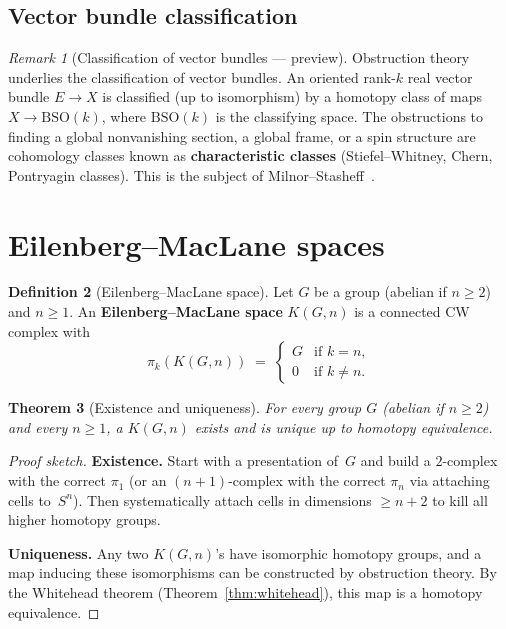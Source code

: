 \documentclass[12pt,a4paper,openany]{book}
\theoremstyle{definition}
\newtheorem{definition}{Definition}[chapter]
\theoremstyle{plain}
\newtheorem{theorem}[definition]{Theorem}
\theoremstyle{remark}
\newtheorem{remark}[definition]{Remark}
\begin{document}
\subsection{Vector bundle classification}

\begin{remark}[Classification of vector bundles --- preview]
Obstruction theory underlies the classification of vector
bundles.  An oriented rank-$k$ real vector bundle
$E\to X$ is classified (up to isomorphism) by a homotopy class
of maps $X\to\mathrm{BSO}(k)$,
where $\mathrm{BSO}(k)$ is the classifying space.  The obstructions
to finding a global nonvanishing section, a global frame, or a
spin structure are cohomology classes known as
\textbf{characteristic classes}
(Stiefel--Whitney,
Chern,
Pontryagin classes).  This is the subject of
Milnor--Stasheff~\cite{milnor-stasheff}.
\end{remark}

\section{Eilenberg--MacLane spaces}\label{sec:eilenberg-maclane}

\begin{definition}[Eilenberg--MacLane space]
Let $G$ be a group (abelian if $n\ge2$) and $n\ge1$.  An
\textbf{Eilenberg--MacLane space} $K(G,n)$ is a connected CW
complex with
\[
  \pi_k(K(G,n))
  \;=\;
  \begin{cases}
    G & \text{if } k=n,\\
    0 & \text{if } k\ne n.
  \end{cases}
\]
\end{definition}

\begin{theorem}[Existence and uniqueness]
\label{thm:em-existence}
For every group $G$ (abelian if $n\ge2$) and every $n\ge1$, a
$K(G,n)$ exists and is unique up to homotopy equivalence.
\end{theorem}

\begin{proof}[Proof sketch]
\textbf{Existence.}  Start with a presentation of~$G$ and build a
$2$-complex with the correct $\pi_1$ (or an $(n{+}1)$-complex with
the correct $\pi_n$ via attaching cells to~$S^n$).  Then
systematically attach cells in dimensions $\ge n+2$ to kill all higher
homotopy groups.

\textbf{Uniqueness.}  Any two $K(G,n)$'s have isomorphic homotopy
groups, and a map inducing these isomorphisms can be constructed
by obstruction theory.  By the Whitehead theorem
(Theorem~\ref{thm:whitehead}), this map is a homotopy equivalence.
\end{proof}
\end{document}
